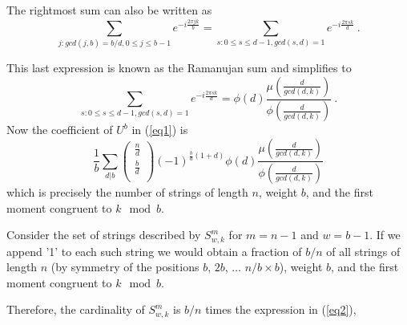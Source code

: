 \documentclass[10pt,conference]{IEEEtran}
\begin{document}
The rightmost sum can also be written as
\begin{equation}
\sum_{j:gcd(j,b)=b/d, 0 \leq j\leq b-1}e^{-i\frac{2\pi
                           j k}{b}}= \sum_{s:0 \leq s\leq d-1,gcd(s,d)=1}
e^{-i\frac{2\pi
                           s k}{d}}~.
\end{equation}


This last expression is known as the Ramanujan sum \cite{apostol}
and simplifies to \begin{equation}\sum_{s:0 \leq s\leq
d-1,gcd(s,d)=1}e^{-i\frac{2\pi
                           s k}{d}}=\phi(d)
\frac{\mu\left(\frac{d}{gcd(d,k)}\right)}{\phi\left(\frac{d}{gcd(d,k)}\right)}~.
                           \end{equation}
Now the coefficient of $U^b$ in (\ref{eq1}) is
\begin{equation}\label{eq2}
\frac{1}{b} \sum_{d|b} \left( \begin{array}{c}
                             \frac{n}{d} \\
                             \frac{b}{d} \\
                           \end{array} \right)(-1)^{\frac{b}{d}(1+d)}\phi(d) \frac{\mu\left(\frac{d}{gcd(d,k)}\right)}{\phi\left(\frac{d}{gcd(d,k)}\right)}
\end{equation}
which is precisely the number of strings of length $n$, weight $b$,
and the first moment congruent to $k \mod b$.

Consider the set of strings described by $S_{w,k}^m$ for $m=n-1$ and
$w=b-1$. If we append '1' to each such string we would obtain a
fraction of $b/n$ of all strings of length $n$ (by symmetry of the
positions $b$, $2b$, $\dots$ $n/b \times b$), weight $b$, and the
first moment congruent to $k \mod b$.

Therefore, the cardinality of $S_{w,k}^m$ is $b/n$ times the
expression in (\ref{eq2}),
\end{document}

